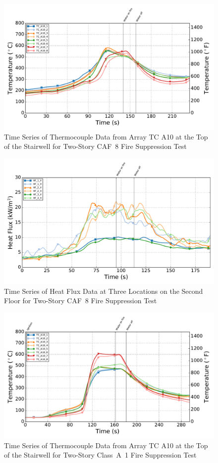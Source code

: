 \documentclass[12pt,oneside]{book}
\begin{document}
\begin{figure}[!ht]
	\includegraphics[width=.85\columnwidth]{../Figures/Script_Figures/Test_40c_West_061415_TC_A10}
	\caption{Time Series of Thermocouple Data from Array TC A10 at the Top of the Stairwell for Two-Story CAF~8 Fire Suppression Test}
	\label{fig:app_caf8_tca10}
\end{figure}

\begin{figure}[!ht]
	\includegraphics[width=.85\columnwidth]{../Figures/Script_Figures/Test_40c_West_061415_Heat_Flux}
	\caption{Time Series of Heat Flux Data at Three Locations on the Second Floor for Two-Story CAF~8 Fire Suppression Test}
	\label{fig:app_caf8_hf}
\end{figure}

\begin{figure}[!ht]
	\includegraphics[width=.85\columnwidth]{../Figures/Script_Figures/Test_41a_West_061415_TC_A10}
	\caption{Time Series of Thermocouple Data from Array TC A10 at the Top of the Stairwell for Two-Story Class~A~1 Fire Suppression Test}
	\label{fig:app_classa1_tca10}
\end{figure}
\end{document}
